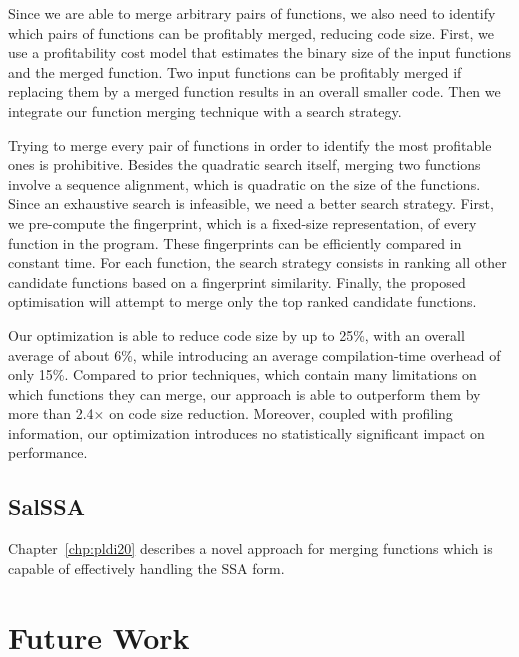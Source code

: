 Since we are able to merge arbitrary pairs of functions, we also need to identify which pairs of functions can be profitably merged, reducing code size.
First, we use a profitability cost model that estimates the binary size of the input functions and the merged function.
Two input functions can be profitably merged if replacing them by a merged function results in an overall smaller code.
Then we integrate our function merging technique with a search strategy.

Trying to merge every pair of functions in order to identify the most profitable ones is prohibitive.
Besides the quadratic search itself, merging two functions involve a sequence alignment, which is quadratic on the size of the functions.
Since an exhaustive search is infeasible, we need a better search strategy.
First, we pre-compute the fingerprint, which is a fixed-size representation, of every function in the program.
These fingerprints can be efficiently compared in constant time.
For each function, the search strategy consists in ranking all other candidate functions based on a fingerprint similarity.
Finally, the proposed optimisation will attempt to merge only the top ranked candidate functions.

Our optimization is able to reduce code size by up to 25\%, with an overall average of about 6\%, while introducing an average compilation-time overhead of only 15\%.
Compared to prior techniques, which contain many limitations on which functions they can merge, our approach is able to outperform them by more than 2.4$\times$ on code size reduction.
Moreover, coupled with profiling information, our optimization introduces no statistically significant impact on performance.

\subsection{SalSSA}

Chapter~\ref{chp:pldi20} describes a novel approach for merging functions which is capable of effectively handling the SSA form.


\section{Future Work} \label{sec:conclusion:futurework}

